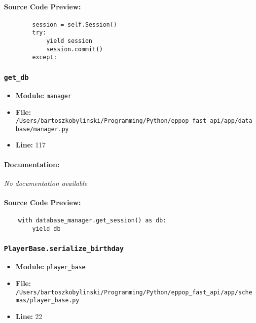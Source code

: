 \documentclass[11pt,a4paper]{article}
\begin{document}
\paragraph{Source Code Preview:}
\begin{verbatim}
        session = self.Session()
        try:
            yield session
            session.commit()
        except:
\end{verbatim}

\vspace{1em}
\subsubsection{\texttt{get\_db}}

\begin{itemize}
    \item \textbf{Module:} \texttt{manager}
    \item \textbf{File:} \texttt{/Users/bartoszkobylinski/Programming/Python/eppop\_fast\_api/app/database/manager.py}
    \item \textbf{Line:} 117
\end{itemize}

\paragraph{Documentation:} \textit{No documentation available}

\paragraph{Source Code Preview:}
\begin{verbatim}
    with database_manager.get_session() as db:
        yield db
\end{verbatim}

\vspace{1em}
\subsubsection{\texttt{PlayerBase.serialize\_birthday}}

\begin{itemize}
    \item \textbf{Module:} \texttt{player\_base}
    \item \textbf{File:} \texttt{/Users/bartoszkobylinski/Programming/Python/eppop\_fast\_api/app/schemas/player\_base.py}
    \item \textbf{Line:} 22
\end{itemize}
\end{document}
